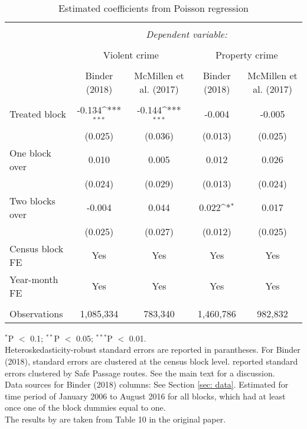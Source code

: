\documentclass[]{article}
\def\sym#1{\ifmmode^{#1}\else\(^{#1}\)\fi}
\begin{document}
\begin{table}[H] \centering
	\caption{Estimated coefficients from Poisson regression}
	\label{tab:main_reg}
	\begin{threeparttable}
		\begin{tabular}{@{\extracolsep{5pt}}lcccc}
			\hline \\
			& \multicolumn{4}{c}{\textit{Dependent variable:}} \\
			\cline{2-5} \\
			& \multicolumn{2}{c}{Violent crime} & \multicolumn{2}{c}{Property crime} \\
			\cline{2-3} \cline{4-5} \\
			& Binder (2018) & McMillen et al. (2017) & Binder (2018) & McMillen et al. (2017) \\
			\cline{2-2} \cline{3-3} \cline{4-4} \cline{5-5} \\
			Treated block & -0.134\sym{***} & -0.144\sym{***} & -0.004 &  -0.005 \\
			& (0.025) & (0.036) &  (0.013) & (0.025) \\ \addlinespace
			One block over & 0.010 & 0.005 &  0.012 & 0.026 \\
			& (0.024) & (0.029) & (0.013) & (0.024) \\ \addlinespace
			Two blocks over & -0.004 & 0.044 & 0.022\sym{*} & 0.017 \\
			& (0.025) & (0.027) & (0.012) & (0.025) \\ \addlinespace
			Census block FE & Yes & Yes & Yes & Yes \\ \addlinespace
			Year-month FE & Yes & Yes & Yes & Yes\\ \addlinespace
			\hline \\
			Observations & 	1,085,334 & 783,340 & 1,460,786 & 982,832\\
			\hline
		\end{tabular}
		\begin{tablenotes}
			$^{*}$P $<$ 0.1; $^{**}$P $<$ 0.05; $^{***}$P $<$ 0.01.\\
			Heteroskedasticity-robust standard errors are reported in parantheses. For Binder (2018), standard errors are clustered at the census block level. \cite{mcmillen2017} reported standard errors clustered by Safe Passage routes. See the main text for a discussion. \\
			Data sources for Binder (2018) columns: See Section \ref{sec: data}. Estimated for time period of January 2006 to August 2016 for all blocks, which had at least once  one of the block dummies equal to one. \\
			The results by \cite{mcmillen2017} are taken from Table 10 in the original paper.
		\end{tablenotes}
	\end{threeparttable}
\end{table}
\end{document}
